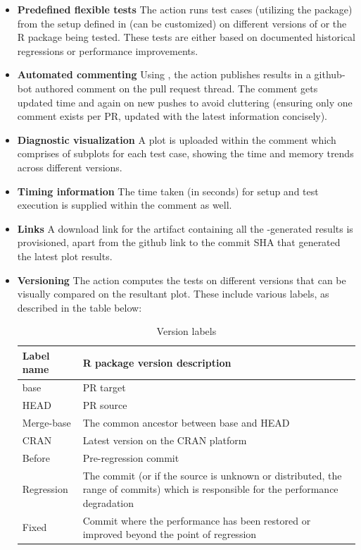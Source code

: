 \begin{itemize}
    \item \textbf{Predefined flexible tests} 
    \newline
    The action runs test cases (utilizing the  package) from the setup defined in  (can be customized) on different versions of  or the R package being tested. These tests are either based on documented historical regressions or performance improvements.
    \item \textbf{Automated commenting}
    \newline
    Using , the action publishes results in a github-bot authored comment on the pull request thread. The comment gets updated time and again on new pushes to avoid cluttering (ensuring only one comment exists per PR, updated with the latest information concisely). 
    \item \textbf{Diagnostic visualization}
    \newline
    A plot is uploaded within the comment which comprises of subplots for each test case, showing the time and memory trends across different  versions.
    \item \textbf{Timing information}
    \newline
    The time taken (in seconds) for setup and test execution is supplied within the comment as well.
    \item \textbf{Links}
    \newline
    A download link for the artifact containing all the -generated results is provisioned, apart from the github link to the commit SHA that generated the latest plot results.

    \item \textbf{Versioning}
    \newline
    The action computes the tests on different  versions that can be visually compared on the resultant plot. These include various labels, as described in the table below:
    \begin{table}[H]
        \centering
            \caption{Version labels}
        \begin{tabular}    
        {|m{1.9cm}|m{10.8cm}|}
  \hline
  Label name & R package version description \\
  \hline

  base & PR target \\
  \hline
  HEAD & PR source \\
  \hline  
  Merge-base & The common ancestor between base and HEAD \\
  \hline
  CRAN & Latest version on the CRAN platform \\
  \hline
  Before & Pre-regression commit \\
  \hline
  Regression & The commit (or if the source is unknown or distributed, the range of commits) which is responsible for the performance degradation \\
  \hline  
  Fixed & Commit where the performance has been restored or improved beyond the point of regression \\


\end{tabular}
\end{table}
\end{itemize}
